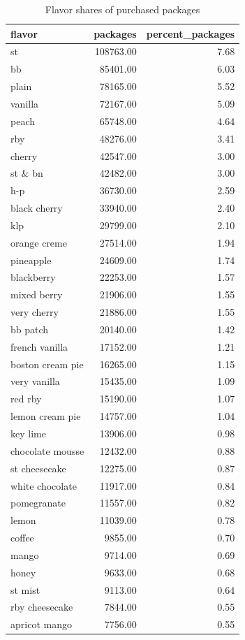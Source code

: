 \begin{table}
\caption{Flavor shares of purchased packages}
\begin{tabular}{lrr}
\toprule
flavor & packages & percent\_packages \\
\midrule
st & 108763.00 & 7.68 \\
bb & 85401.00 & 6.03 \\
plain & 78165.00 & 5.52 \\
vanilla & 72167.00 & 5.09 \\
peach & 65748.00 & 4.64 \\
rby & 48276.00 & 3.41 \\
cherry & 42547.00 & 3.00 \\
st \& bn & 42482.00 & 3.00 \\
h-p & 36730.00 & 2.59 \\
black cherry & 33940.00 & 2.40 \\
klp & 29799.00 & 2.10 \\
orange creme & 27514.00 & 1.94 \\
pineapple & 24609.00 & 1.74 \\
blackberry & 22253.00 & 1.57 \\
mixed berry & 21906.00 & 1.55 \\
very cherry & 21886.00 & 1.55 \\
bb patch & 20140.00 & 1.42 \\
french vanilla & 17152.00 & 1.21 \\
boston cream pie & 16265.00 & 1.15 \\
very vanilla & 15435.00 & 1.09 \\
red rby & 15190.00 & 1.07 \\
lemon cream pie & 14757.00 & 1.04 \\
key lime & 13906.00 & 0.98 \\
chocolate mousse & 12432.00 & 0.88 \\
st cheesecake & 12275.00 & 0.87 \\
white chocolate & 11917.00 & 0.84 \\
pomegranate & 11557.00 & 0.82 \\
lemon & 11039.00 & 0.78 \\
coffee & 9855.00 & 0.70 \\
mango & 9714.00 & 0.69 \\
honey & 9633.00 & 0.68 \\
st mist & 9113.00 & 0.64 \\
rby cheesecake & 7844.00 & 0.55 \\
apricot mango & 7756.00 & 0.55 \\

\end{tabular}
\end{table}
